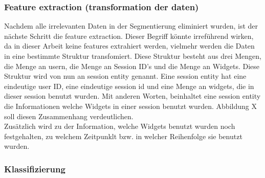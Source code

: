 \subsubsection{Feature extraction (transformation der daten)}
\label{ssub:Feature_extraction}
Nachdem alle irrelevanten Daten in der Segmentierung eliminiert wurden, ist der nächste Schritt die feature extraction. Dieser Begriff könnte irreführend wirken, da in dieser Arbeit keine features extrahiert werden, vielmehr werden die Daten in eine bestimmte Struktur transfomiert. Diese Struktur besteht aus drei Mengen, die Menge an usern, die Menge an Session ID's und die Menge an Widgets. Diese Struktur wird von nun an session entity genannt. Eine session entity hat eine eindeutige user ID, eine eindeutige session id und eine Menge an widgets, die in dieser session benutzt wurden. Mit anderen Worten, beinhaltet eine session entity die Informationen welche Widgets in einer session benutzt wurden. Abbildung X soll diesen Zusammenhang verdeutlichen.\\
Zusätzlich wird zu der Information, welche Widgets benutzt wurden noch festgehalten, zu welchem Zeitpunklt bzw. in welcher Reihenfolge sie benutzt wurden.

\subsubsection{Klassifizierung}
\label{ssub:Klassifizierung}


